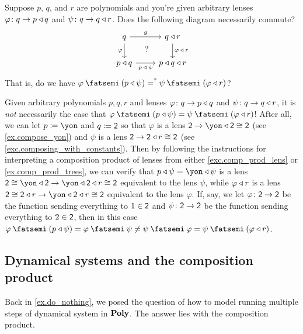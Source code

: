 \documentclass[Book-Poly]{subfiles}
\begin{document}
\begin{exercise}
Suppose $p$, $q$, and $r$ are polynomials and you're given arbitrary lenses $\varphi\colon q\to p\mathbin{\triangleleft} q$ and $\psi\colon q\to q\mathbin{\triangleleft} r$. Does the following diagram necessarily commute?
\[
\begin{tikzcd}
	q\ar[r, "g"]\ar[d, "\varphi"']&
	q\tri r\ar[d, "\varphi\:\tri\:r"]\\
	p\tri q\ar[r, "p\:\tri\:\psi"']&
	p\tri q\tri r\ar[ul, phantom, "?"]
\end{tikzcd}
\]
That is, do we have $\varphi\then (p\tri \psi)=^?\psi\then (\varphi\tri r)$?
\begin{solution}
Given arbitrary polynomials $p,q,r$ and lenses $\varphi\colon q\to p\mathbin{\triangleleft} q$ and $\psi\colon q\to q\mathbin{\triangleleft} r$, it is \emph{not} necessarily the case that $\varphi\then (p\tri \psi)=\psi\then (\varphi\tri r)$!
After all, we can let $p\coloneqq\yon$ and $q\coloneqq\textsf{2}$ so that $\varphi$ is a lens $\2\to\yon\tri\2\iso\2$ (see \cref{ex.compose_yon}) and $\psi$ is a lens $\textsf{2}\to\textsf{2}\mathbin{\triangleleft} r\cong\textsf{2}$ (see \cref{exc.composing_with_constants}).
Then by following the instructions for interpreting a composition product of lenses from either \cref{exc.comp_prod_lens} or \cref{ex.comp_prod_trees}, we can verify that $p\tri \psi=\yon\tri \psi$ is a lens $\2\iso\yon\tri\2\to\yon\tri\2\tri r\iso\2$ equivalent to the lens $\psi$, while $\varphi\mathbin{\triangleleft} r$ is a lens $\2\iso\2\tri r\to\yon\tri\2\tri r\iso\2$ equivalent to the lens $\varphi$.
If, say, we let $\varphi\colon\textsf{2}\to\textsf{2}$ be the function sending everything to $1\in\textsf{2}$ and $\psi\colon\textsf{2}\to\textsf{2}$ be the function sending everything to $2\in\textsf{2}$, then in this case $\varphi\then (p\tri \psi)=\varphi\then \psi\neq \psi\then \varphi=\psi\then (\varphi\tri r)$.
\end{solution}
\end{exercise}

\subsection{Dynamical systems and the composition product} \label{subsec.comon.comp.def.dyn_sys}

Back in \cref{ex.do_nothing}, we posed the question of how to model running multiple steps of dynamical system in $\mathbf{Poly}$.
The answer lies with the composition product.
\end{document}
